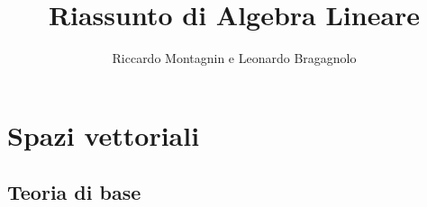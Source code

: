 \documentclass[12pt,a4paper,oneside]{book}
\begin{document}

\title{Riassunto di Algebra Lineare}
\author{Riccardo Montagnin e Leonardo Bragagnolo}
\date{}

\maketitle

\tableofcontents




				\chapter{Spazi vettoriali}


				\section{Teoria di base}
\end{document}
